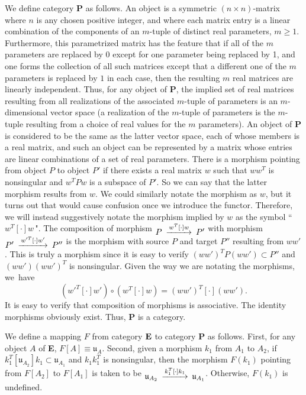 \documentclass{amsart}
\theoremstyle{definition}
\numberwithin{theorem}{section}
\numberwithin{equation}{section}
\begin{document}
We define category {\bf P} as follows. An object is a symmetric $(n\times n)$-matrix where $n$ is any chosen positive integer, and where each matrix entry is a linear combination of the components of an $m$-tuple of distinct real parameters, $m\ge 1$.  Furthermore, this parametrized matrix has the feature that if all of the $m$ parameters are replaced by 0 except for one parameter being replaced by 1, and one forms the collection of all such matrices except that a different one of the $m$ parameters is replaced by $1$ in each case, then the resulting $m$ real matrices are linearly independent.  Thus, for any object of {\bf P}, the implied set of real matrices resulting from all realizations of the associated $m$-tuple of parameters is an $m$-dimensional vector space (a realization of the $m$-tuple of parameters is the $m$-tuple resulting from a choice of real values for the $m$ parameters).  An object of {\bf P} is considered to be the same as the latter vector space, each of whose members is a real matrix, and such an object can be represented by a matrix whose entries are linear combinations of a set of real parameters.   There is a morphism pointing from object $P$ to object $P'$ if there exists a real matrix $w$ such that $ww^T$ is nonsingular and $w^TPw$ is a subspace of $P'$.  So we can say that the latter morphism results from $w$.   We could similarly notate the morphism as $w$, but it turns out that would cause confusion once we introduce the functor.  Therefore, we will instead suggestively notate the morphism implied by $w$ as the symbol ``\,$w^T[\cdot]w$\,".    The composition of morphism $\begin{CD}  P @>w^T[\cdot]w>> P'\end{CD}$ with morphism $\begin{CD}  P' @>w'^T[\cdot]w'>> P''\end{CD}$ is the morphism with source $P$ and target $P''$ resulting from $ww'$.  This is truly a morphism since it is easy to verify $(ww')^T P(ww')\subset P''$ and $(ww')(ww')^T$ is nonsingular.
Given the way we are notating the morphisms, \mbox{we have} \begin{equation}\label{2/22/25.1}(w'^T[\cdot]w')\circ (w^T[\cdot]w) = (ww')^T[\cdot](ww').\end{equation} It is easy to verify that composition of morphisms is associative. The identity morphisms obviously exist. Thus, {\bf P} is a category.

We define a mapping $F$ from category ${\bf E}$ to category {\bf P} as follows.  First, for any object $A$ of {\bf E}, $F[
A] \equiv \mathfrak{u}_A$.  Second, given a morphism $k_1$ from $A_1$ to $A_2$, if $k_1^T[\mathfrak{u}_{A_2}]k_1 \subset \mathfrak{u}_{A_1}$ and $k_1k_1^T$ is nonsingular, then the morphism $F(k_1)$ pointing from $F[A_2]$ to $F[A_1]$ is taken to be $\begin{CD}  \mathfrak{u}_{A_2} @>k_1^T[\cdot]k_1>> \mathfrak{u}_{A_1}\end{CD}$.  Otherwise, $F(k_1)$ is undefined.
\end{document}
